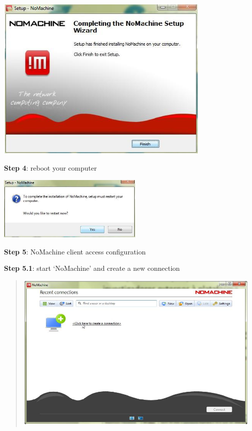 \documentclass[
  11pt,
  a4paper,
]{article}
\begin{document}
\includegraphics[width=4.09115in,height=3.14961in]{./media/image24.png}

\textbf{\hfill\break
}

\textbf{Step 4}: reboot your computer

\includegraphics[width=2.75591in,height=1.21602in]{./media/image25.png}

\textbf{Step 5}: NoMachine client access configuration

\textbf{Step 5.1}: start `NoMachine' and create a new connection

\begin{quote}
\includegraphics[width=4.72441in,height=3.02971in]{./media/image26.png}
\end{quote}
\end{document}
